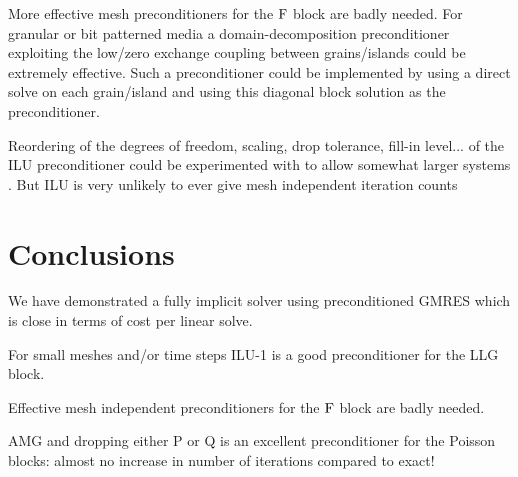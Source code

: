 More effective mesh preconditioners for the $\mathrm{F}$ block are badly needed.
For granular or bit patterned media a domain-decomposition preconditioner exploiting the low/zero exchange coupling between grains/islands could be extremely effective.
Such a preconditioner could be implemented by using a direct solve on each grain/island and using this diagonal block solution as the preconditioner.

Reordering of the degrees of freedom, scaling, drop tolerance, fill-in level... of the ILU preconditioner could be experimented with to allow somewhat larger systems \cite[287]{Saad2000}.
But ILU is very unlikely to ever give mesh independent iteration counts 


\section{Conclusions}

We have demonstrated a fully implicit solver using preconditioned GMRES which is close in terms of cost per linear solve.

For small meshes and/or time steps ILU-1 is a good preconditioner for the LLG block.

Effective mesh independent preconditioners for the $\mathrm{F}$ block are badly needed.

AMG and dropping either P or Q is an excellent preconditioner for the Poisson blocks: almost no increase in number of iterations compared to exact!



